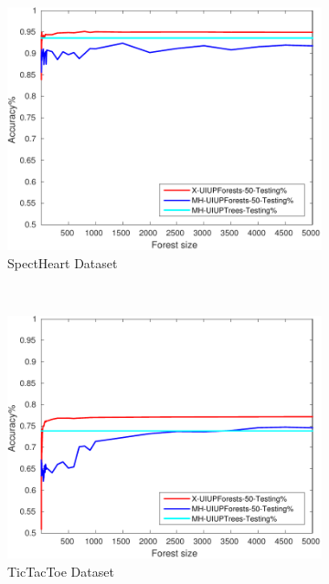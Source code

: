 \begin{figure}[ht]
\begin{subfigure}[b]{0.3\textwidth}
  	\includegraphics[width=\textwidth]{figs/PLPTF/Forests/SpectHeartDownsampledFurther_Forests_X_MH.pdf}
  	\caption{SpectHeart Dataset}
		\label{fig:S3}
	\end{subfigure}
  \\
  \begin{subfigure}[b]{0.3\textwidth}
		\centering
  	\includegraphics[width=\textwidth]{figs/PLPTF/Forests/TicTacToe_Forests_X_MH.pdf}
  	\caption{TicTacToe Dataset}
		\label{fig:T3}
	\end{subfigure}
  \begin{subfigure}[b]{0.3\textwidth}
		\centering

\end{subfigure}
\end{figure}
